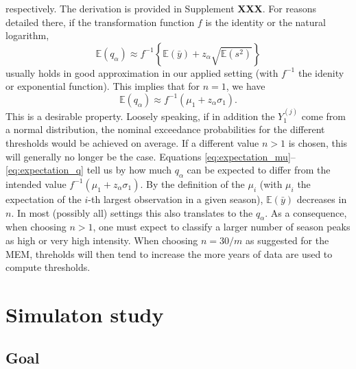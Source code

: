 \documentclass{article}
\newcommand{\sd}{s}
\newcommand{\mean}{\bar{y}}
\begin{document}
respectively. The derivation is provided in Supplement \textbf{XXX}. For reasons detailed there, if the transformation function $f$ is the identity or the natural logarithm,
\begin{equation}
\mathbb{E}(q_\alpha) \approx f^{-1}\left\{\mathbb{E}(\mean) + z_\alpha \sqrt{\mathbb{E}(\sd^2)}\right\}
\label{eq:expectation_q}
\end{equation}
usually holds in good approximation in our applied setting (with $f^{-1}$ the idenity or exponential function). This implies that for $n = 1$, we have
$$
\mathbb{E}(q_\alpha) \approx f^{-1}(\mu_1 + z_\alpha \sigma_1).
$$
This is a desirable property. Loosely speaking, if in addition the $Y_{1}^{(j)}$ come from a normal distribution, the nominal exceedance probabilities for the different thresholds would be achieved on average. If a different value $n > 1$ is chosen, this will generally no longer be the case. Equations \eqref{eq:expectation_mu}--\eqref{eq:expectation_q} tell us by how much $q_\alpha$ can be expected to differ from the intended value $f^{-1}(\mu_1 + z_\alpha \sigma_1)$. By the definition of the $\mu_i$ (with $\mu_i$ the expectation of the $i$-th largest observation in a given season), $\mathbb{E}(\mean)$ decreases in $n$. In most (possibly all) settings this also translates to the $q_\alpha$. As a consequence, when choosing $n > 1$, one must expect to classify a larger number of season peaks as high or very high intensity. When choosing $n = 30/m$ as suggested for the MEM, threholds will then tend to increase the more years of data are used to compute thresholds.

\section{Simulaton study}
\label{sec:simulation}

\subsection{Goal}
\label{subsec:simulation_goal}
\end{document}
